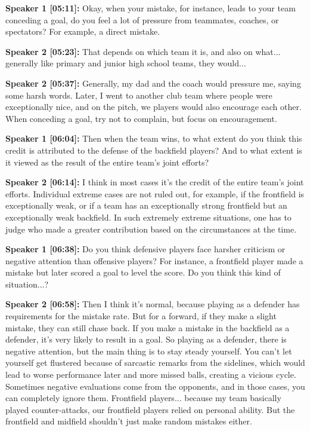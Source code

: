 \documentclass[11pt,a4paper]{article}
\begin{document}
\begin{linenumbers}
\vspace{0.5em}
\noindent \textbf{Speaker 1 [05:11]:} Okay, when your mistake, for instance, leads to your team conceding a goal, do you feel a lot of pressure from teammates, coaches, or spectators? For example, a direct mistake.

\vspace{0.5em}
\noindent \textbf{Speaker 2 [05:23]:} That depends on which team it is, and also on what... generally like primary and junior high school teams, they would...

\vspace{0.5em}
\noindent \textbf{Speaker 2 [05:37]:} Generally, my dad and the coach would pressure me, saying some harsh words. Later, I went to another club team where people were exceptionally nice, and on the pitch, we players would also encourage each other. When conceding a goal, try not to complain, but focus on encouragement.

\vspace{0.5em}
\noindent \textbf{Speaker 1 [06:04]:} Then when the team wins, to what extent do you think this credit is attributed to the defense of the backfield players? And to what extent is it viewed as the result of the entire team's joint efforts?

\vspace{0.5em}
\noindent \textbf{Speaker 2 [06:14]:} I think in most cases it's the credit of the entire team's joint efforts. Individual extreme cases are not ruled out, for example, if the frontfield is exceptionally weak, or if a team has an exceptionally strong frontfield but an exceptionally weak backfield. In such extremely extreme situations, one has to judge who made a greater contribution based on the circumstances at the time.

\vspace{0.5em}
\noindent \textbf{Speaker 1 [06:38]:} Do you think defensive players face harsher criticism or negative attention than offensive players? For instance, a frontfield player made a mistake but later scored a goal to level the score. Do you think this kind of situation...?

\vspace{0.5em}
\noindent \textbf{Speaker 2 [06:58]:} Then I think it's normal, because playing as a defender has requirements for the mistake rate. But for a forward, if they make a slight mistake, they can still chase back. If you make a mistake in the backfield as a defender, it's very likely to result in a goal. So playing as a defender, there is negative attention, but the main thing is to stay steady yourself. You can't let yourself get flustered because of sarcastic remarks from the sidelines, which would lead to worse performance later and more missed balls, creating a vicious cycle. Sometimes negative evaluations come from the opponents, and in those cases, you can completely ignore them. Frontfield players... because my team basically played counter-attacks, our frontfield players relied on personal ability. But the frontfield and midfield shouldn't just make random mistakes either.


\end{linenumbers}
\end{document}
